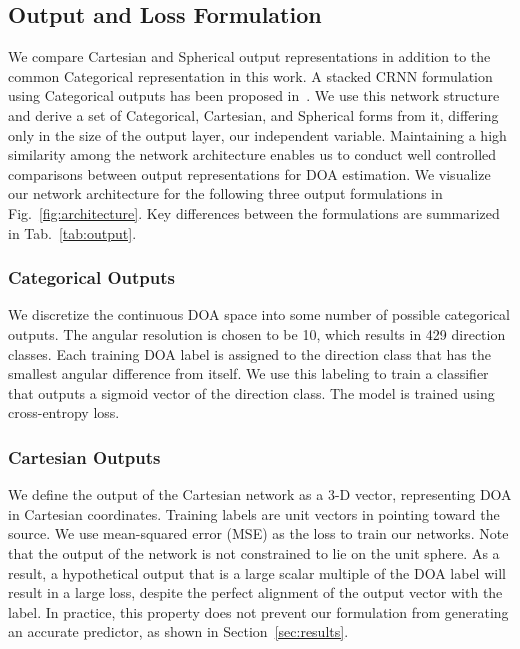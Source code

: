 \documentclass[a4paper]{article}
\begin{document}
\subsection{Output and Loss Formulation}
\label{sec:formulation}
We compare Cartesian  and Spherical  output representations in addition to the common Categorical representation in this work. A stacked CRNN formulation using Categorical outputs has been proposed in~\cite{perotin2018crnn}. We use this network structure and derive a set of Categorical, Cartesian, and Spherical forms from it, differing only in the size of the output layer, our independent variable. Maintaining a high similarity among the network architecture enables us to conduct well controlled comparisons between output representations for DOA estimation. We visualize our network architecture for the following three output formulations in Fig.~\ref{fig:architecture}. Key differences between the formulations are summarized in Tab.~\ref{tab:output}.

\subsubsection{Categorical Outputs}
We discretize the continuous DOA space into some number of possible categorical outputs. The angular resolution is chosen to be 10, which results in 429 direction classes. Each training DOA label is assigned to the direction class that has the smallest angular difference from itself. We use this labeling to train a classifier that outputs a sigmoid vector of the direction class. The model is trained using cross-entropy loss.

\subsubsection{Cartesian Outputs}
We define the output of the Cartesian network as a 3-D vector, representing DOA in Cartesian coordinates. Training labels are unit vectors in  pointing toward the source. We use mean-squared error (MSE) as the loss to train our networks. Note that the output of the network is not constrained to lie on the unit sphere. As a result, a hypothetical output that is a large scalar multiple of the DOA label will result in a large loss, despite the perfect alignment of the output vector with the label. In practice, this property does not prevent our formulation from generating an accurate predictor, as shown in Section~\ref{sec:results}.
\end{document}
